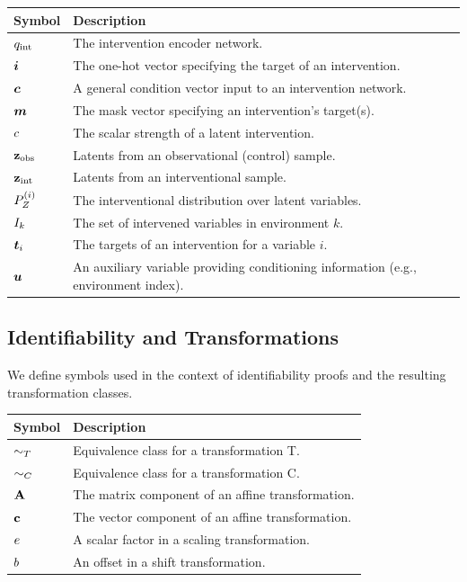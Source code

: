 \begin{table}[H]
\begin{tabularx}{\textwidth}{l X}
\toprule
\textbf{Symbol} & \textbf{Description} \\
\midrule
$q_{\text{int}}$ & The intervention encoder network. \\
${\bm{i}}$ & The one-hot vector specifying the target of an intervention. \\
${\bm{c}}$ & A general condition vector input to an intervention network. \\
${\bm{m}}$ & The mask vector specifying an intervention's target(s). \\
$c$ & The scalar strength of a latent intervention. \\
${\mathbf{z}}_{\text{obs}}$ & Latents from an observational (control) sample. \\
${\mathbf{z}}_{\text{int}}$ & Latents from an interventional sample. \\
$P_Z^{(i)}$ & The interventional distribution over latent variables. \\
$I_k$ & The set of intervened variables in environment $k$. \\
${\bm{t}}_i$ & The targets of an intervention for a variable $i$. \\
${\bm{u}}$ & An auxiliary variable providing conditioning information (e.g., environment index). \\
\bottomrule
\end{tabularx}
\end{table}

\subsection{Identifiability and Transformations}
\label{app:nomenclature:identifiability}

We define symbols used in the context of identifiability proofs and the resulting transformation classes.

\begin{table}[H]
\begin{tabularx}{\textwidth}{l X}
\toprule
\textbf{Symbol} & \textbf{Description} \\
\midrule
$\sim_T$ & Equivalence class for a transformation T. \\
$\sim_C$ & Equivalence class for a transformation C. \\
$\affinetransform$ & The matrix component of an affine transformation. \\
$\affineoffset$ & The vector component of an affine transformation. \\
$e$ & A scalar factor in a scaling transformation. \\
$b$ & An offset in a shift transformation. \\
\bottomrule
\end{tabularx}
\end{table}

